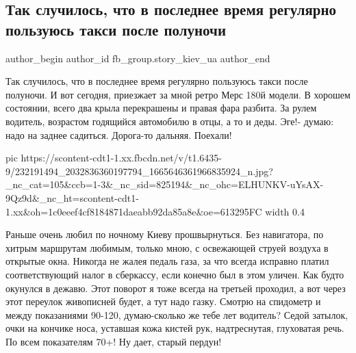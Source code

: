  
 
 
 
 
 
\subsection{Так случилось, что в последнее время регулярно пользуюсь такси после полуночи}
\label{sec:03_08_2021.fb.fb_group.story_kiev_ua.1.taxi}
 
\ifcmt
 author_begin
   author_id fb_group.story_kiev_ua
 author_end
\fi


Так случилось, что в последнее время регулярно пользуюсь такси после полуночи.
И вот сегодня, приезжает за мной ретро Мерс 180й модели. В хорошем состоянии,
всего два крыла перекрашены и правая фара разбита. За рулем водитель, возрастом
годящийся автомобилю в отцы, а то и деды. Эге!- думаю: надо на заднее садиться.
Дорога-то дальняя. Поехали!

\ifcmt
  pic https://scontent-cdt1-1.xx.fbcdn.net/v/t1.6435-9/232191494_2032836360197794_1665646361966835924_n.jpg?_nc_cat=105&ccb=1-3&_nc_sid=825194&_nc_ohc=ELHUNKV-uYsAX-9Qz9d&_nc_ht=scontent-cdt1-1.xx&oh=1c0eeef4cf8184871daeabb92da85a8e&oe=613295FC
  width 0.4
\fi

Раньше очень любил по ночному Киеву прошвырнуться. Без навигатора, по хитрым
маршрутам любимым, только мною, с освежающей струей воздуха в открытые окна.
Никогда не жалея педаль газа, за что всегда исправно платил соответствующий
налог в сберкассу, если конечно был в этом уличен. Как будто окунулся в дежавю.
Этот поворот я тоже всегда на третьей проходил, а вот через этот переулок
живописней будет, а тут надо газку. Смотрю на спидометр и между показаниями
90-120, думаю-сколько же тебе лет водитель? Седой затылок, очки на кончике
носа, уставшая кожа кистей рук, надтреснутая, глуховатая речь. По всем
показателям 70+! Ну дает, старый пердун!

